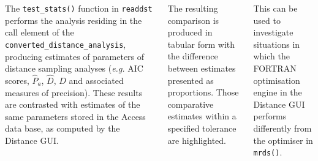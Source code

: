 \documentclass[14pt,a1paper,landscape]{tikzposter}
\begin{document}
\begin{columns}
{	The \texttt{test\_stats()} function in \texttt{readdst} performs the analysis residing in the call element of the \texttt{converted\_distance\_analysis}, producing estimates of parameters of distance sampling analyses (\emph{e.g.} AIC scores, $\hat{P}_a$, $\hat{D}$, $\hat{D}$ and associated measures of precision).  These results are contrasted with estimates of the same parameters stored in the Access data base, as computed by the Distance GUI.
	
	The resulting comparison is produced in tabular form with the difference between estimates presented as proportions.  Those comparative estimates within a specified tolerance are highlighted.
	
	
	This can be used to investigate situations in which the FORTRAN optimisation engine in the Distance GUI performs differently from the optimiser in \texttt{mrds()}.
}



\end{columns}
\end{document}

